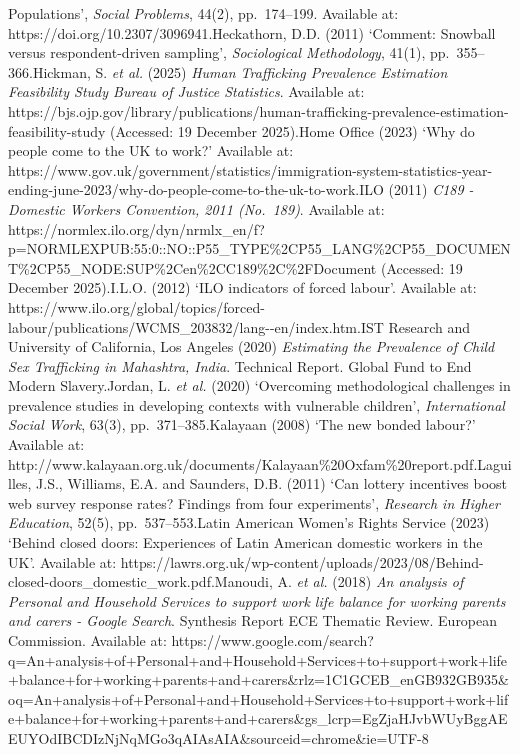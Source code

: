 \documentclass[
  12pt,
  letterpaper,
  DIV=11,
  numbers=noendperiod]{scrartcl}
\begin{document}
{{Populations', \emph{Social Problems}, 44(2), pp.~174--199. Available at:
https://doi.org/10.2307/3096941.Heckathorn, D.D. (2011) `Comment:
Snowball versus respondent-driven sampling', \emph{Sociological
Methodology}, 41(1), pp.~355--366.Hickman, S. \emph{et al.} (2025)
\emph{Human Trafficking Prevalence Estimation Feasibility Study
\textbar{} Bureau of Justice Statistics}. Available at:
https://bjs.ojp.gov/library/publications/human-trafficking-prevalence-estimation-feasibility-study
(Accessed: 19 December 2025).Home Office (2023) `Why do people come to
the UK to work?' Available at:
https://www.gov.uk/government/statistics/immigration-system-statistics-year-ending-june-2023/why-do-people-come-to-the-uk-to-work.ILO
(2011) \emph{C189 - Domestic Workers Convention, 2011 (No.~189)}.
Available at:
https://normlex.ilo.org/dyn/nrmlx\_en/f?p=NORMLEXPUB:55:0::NO::P55\_TYPE\%2CP55\_LANG\%2CP55\_DOCUMENT\%2CP55\_NODE:SUP\%2Cen\%2CC189\%2C\%2FDocument
(Accessed: 19 December 2025).I.L.O. (2012) `ILO indicators of forced
labour'. Available at:
https://www.ilo.org/global/topics/forced-labour/publications/WCMS\_203832/lang-\/-en/index.htm.IST
Research and University of California, Los Angeles (2020)
\emph{Estimating the Prevalence of Child Sex Trafficking in Mahashtra,
India}. Technical Report. Global Fund to End Modern Slavery.Jordan, L.
\emph{et al.} (2020) `Overcoming methodological challenges in prevalence
studies in developing contexts with vulnerable children',
\emph{International Social Work}, 63(3), pp.~371--385.Kalayaan (2008)
`The new bonded labour?' Available at:
http://www.kalayaan.org.uk/documents/Kalayaan\%20Oxfam\%20report.pdf.Laguilles,
J.S., Williams, E.A. and Saunders, D.B. (2011) `Can lottery incentives
boost web survey response rates? Findings from four experiments',
\emph{Research in Higher Education}, 52(5), pp.~537--553.Latin American
Women's Rights Service (2023) `Behind closed doors: Experiences of Latin
American domestic workers in the UK'. Available at:
https://lawrs.org.uk/wp-content/uploads/2023/08/Behind-closed-doors\_domestic\_work.pdf.Manoudi,
A. \emph{et al.} (2018) \emph{An analysis of Personal and Household
Services to support work life balance for working parents and carers -
Google Search}. Synthesis Report ECE Thematic Review. European
Commission. Available at:
https://www.google.com/search?q=An+analysis+of+Personal+and+Household+Services+to+support+work+life+balance+for+working+parents+and+carers\&rlz=1C1GCEB\_enGB932GB935\&oq=An+analysis+of+Personal+and+Household+Services+to+support+work+life+balance+for+working+parents+and+carers\&gs\_lcrp=EgZjaHJvbWUyBggAEEUYOdIBCDIzNjNqMGo3qAIAsAIA\&sourceid=chrome\&ie=UTF-8
}}
\end{document}

